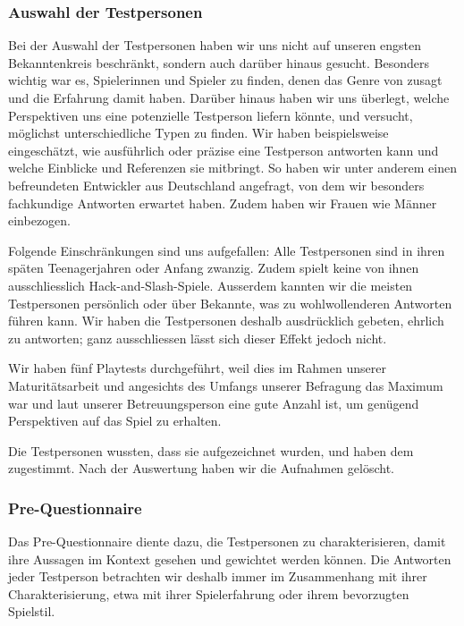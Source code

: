 \documentclass[../Main.tex]{subfiles}
\begin{document}
\subsubsection{Auswahl der Testpersonen} \label{sec:AuswahlTP}
Bei der Auswahl der Testpersonen haben wir uns nicht auf unseren engsten Bekanntenkreis beschränkt, sondern auch darüber hinaus gesucht. Besonders wichtig war es, Spielerinnen und Spieler zu finden, denen das Genre von  zusagt und die Erfahrung damit haben. Darüber hinaus haben wir uns überlegt, welche Perspektiven uns eine potenzielle Testperson liefern könnte, und versucht, möglichst unterschiedliche Typen zu finden. Wir haben beispielsweise eingeschätzt, wie ausführlich oder präzise eine Testperson antworten kann und welche Einblicke und Referenzen sie mitbringt. So haben wir unter anderem einen befreundeten Entwickler aus Deutschland angefragt, von dem wir besonders fachkundige Antworten erwartet haben. Zudem haben wir Frauen wie Männer einbezogen.

Folgende Einschränkungen sind uns aufgefallen: Alle Testpersonen sind in ihren späten Teenagerjahren oder Anfang zwanzig. Zudem spielt keine von ihnen ausschliesslich Hack-and-Slash-Spiele. Ausserdem kannten wir die meisten Testpersonen persönlich oder über Bekannte, was zu wohlwollenderen Antworten führen kann. Wir haben die Testpersonen deshalb ausdrücklich gebeten, ehrlich zu antworten; ganz ausschliessen lässt sich dieser Effekt jedoch nicht.

Wir haben fünf Playtests durchgeführt, weil dies im Rahmen unserer Maturitätsarbeit und angesichts des Umfangs unserer Befragung das Maximum war und laut unserer Betreuungsperson eine gute Anzahl ist, um genügend Perspektiven auf das Spiel zu erhalten.

Die Testpersonen wussten, dass sie aufgezeichnet wurden, und haben dem zugestimmt. Nach der Auswertung haben wir die Aufnahmen gelöscht.

\subsubsection{Pre-Questionnaire} \label{sec:PreQuestionnaire}

Das Pre-Questionnaire diente dazu, die Testpersonen zu charakterisieren, damit ihre Aussagen im Kontext gesehen und gewichtet werden können. Die Antworten jeder Testperson betrachten wir deshalb immer im Zusammenhang mit ihrer Charakterisierung, etwa mit ihrer Spielerfahrung oder ihrem bevorzugten Spielstil.
\end{document}
